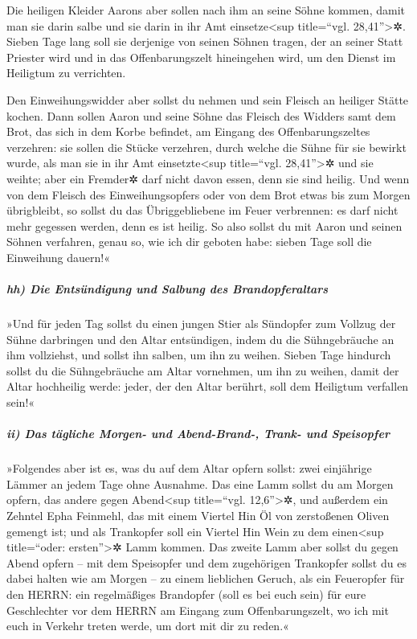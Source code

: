  Die heiligen Kleider Aarons aber sollen nach ihm an
seine Söhne kommen, damit man sie darin salbe und sie darin in ihr Amt
einsetze\textless sup title=``vgl. 28,41''\textgreater✲. 
Sieben Tage lang soll sie derjenige von seinen Söhnen tragen, der an
seiner Statt Priester wird und in das Offenbarungszelt hineingehen wird,
um den Dienst im Heiligtum zu verrichten.

 Den Einweihungswidder aber sollst du nehmen und sein
Fleisch an heiliger Stätte kochen.  Dann sollen Aaron und
seine Söhne das Fleisch des Widders samt dem Brot, das sich in dem Korbe
befindet, am Eingang des Offenbarungszeltes verzehren: 
sie sollen die Stücke verzehren, durch welche die Sühne für sie bewirkt
wurde, als man sie in ihr Amt einsetzte\textless sup title=``vgl.
28,41''\textgreater✲ und sie weihte; aber ein Fremder✲ darf nicht davon
essen, denn sie sind heilig.  Und wenn von dem Fleisch
des Einweihungsopfers oder von dem Brot etwas bis zum Morgen
übrigbleibt, so sollst du das Übriggebliebene im Feuer verbrennen: es
darf nicht mehr gegessen werden, denn es ist heilig.  So
also sollst du mit Aaron und seinen Söhnen verfahren, genau so, wie ich
dir geboten habe: sieben Tage soll die Einweihung dauern!«

\hypertarget{hh-die-entsuxfcndigung-und-salbung-des-brandopferaltars}{%
\subparagraph{hh) Die Entsündigung und Salbung des
Brandopferaltars}\label{hh-die-entsuxfcndigung-und-salbung-des-brandopferaltars}}

 »Und für jeden Tag sollst du einen jungen Stier als
Sündopfer zum Vollzug der Sühne darbringen und den Altar entsündigen,
indem du die Sühngebräuche an ihm vollziehst, und sollst ihn salben, um
ihn zu weihen.  Sieben Tage hindurch sollst du die
Sühngebräuche am Altar vornehmen, um ihn zu weihen, damit der Altar
hochheilig werde: jeder, der den Altar berührt, soll dem Heiligtum
verfallen sein!«

\hypertarget{ii-das-tuxe4gliche-morgen--und-abend-brand--trank--und-speisopfer}{%
\subparagraph{ii) Das tägliche Morgen- und Abend-Brand-, Trank- und
Speisopfer}\label{ii-das-tuxe4gliche-morgen--und-abend-brand--trank--und-speisopfer}}

 »Folgendes aber ist es, was du auf dem Altar opfern
sollst: zwei einjährige Lämmer an jedem Tage ohne Ausnahme.
 Das eine Lamm sollst du am Morgen opfern, das andere
gegen Abend\textless sup title=``vgl. 12,6''\textgreater✲,
 und außerdem ein Zehntel Epha Feinmehl, das mit einem
Viertel Hin Öl von zerstoßenen Oliven gemengt ist; und als Trankopfer
soll ein Viertel Hin Wein zu dem einen\textless sup title=``oder:
ersten''\textgreater✲ Lamm kommen.  Das zweite Lamm aber
sollst du gegen Abend opfern -- mit dem Speisopfer und dem zugehörigen
Trankopfer sollst du es dabei halten wie am Morgen -- zu einem
lieblichen Geruch, als ein Feueropfer für den HERRN:  ein
regelmäßiges Brandopfer (soll es bei euch sein) für eure Geschlechter
vor dem HERRN am Eingang zum Offenbarungszelt, wo ich mit euch in
Verkehr treten werde, um dort mit dir zu reden.«

